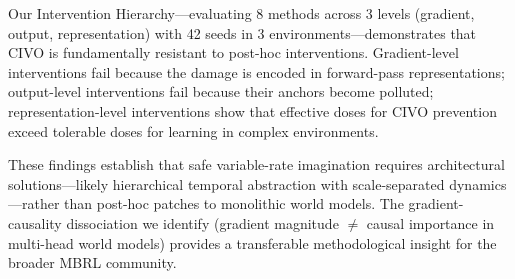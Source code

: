 \documentclass[10pt,letterpaper]{article}
\begin{document}
Our Intervention Hierarchy---evaluating 8 methods across 3 levels (gradient, output, representation) with 42 seeds in 3 environments---demonstrates that CIVO is fundamentally resistant to post-hoc interventions.
Gradient-level interventions fail because the damage is encoded in forward-pass representations; output-level interventions fail because their anchors become polluted; representation-level interventions show that effective doses for CIVO prevention exceed tolerable doses for learning in complex environments.

These findings establish that safe variable-rate imagination requires architectural solutions---likely hierarchical temporal abstraction with scale-separated dynamics---rather than post-hoc patches to monolithic world models.
The gradient-causality dissociation we identify (gradient magnitude $\neq$ causal importance in multi-head world models) provides a transferable methodological insight for the broader MBRL community.


\end{document}
